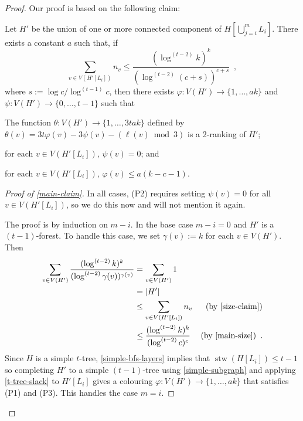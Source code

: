 \documentclass[kpfonts]{patmorin}
\DeclareMathOperator{\stw}{stw}
\theoremstyle{named}
\begin{document}
\begin{proof}
Our proof is based on the following claim:

    \begin{clm}\label{main-claim}
        Let $H'$ be the union of one or more connected component of $H[\bigcup_{j=i}^m L_i]$. There exists a constant $a$ such that, if
        \begin{equation}
            \sum_{v\in V(H'[L_i])} n_v\le \frac{(\log^{(t-2)} k)^{k}}{(\log^{(t-2)} (c+s))^{c+s}} \enspace , \label{main-size}
        \end{equation}
        where $s:=\log c/\log^{(t-1)} c$,
        then there exists $\varphi:V(H')\to\{1,\ldots,ak\}$ and $\psi:V(H')\to\{0,\ldots,t-1\}$ such that
        \begin{compactenum}[(P1)]
            \item The function $\theta:V(H')\to\{1,\ldots,3tak\}$ defined by $\theta(v)=3t\varphi(v) - 3\psi(v) -(\ell(v)\bmod 3)$ is a 2-ranking of $H'$;
            \item for each $v\in V(H'[L_i])$, $\psi(v)=0$; and
            \item for each $v\in V(H'[L_i])$, $\varphi(v)\le a(k-c-1)$.
        \end{compactenum}
    \end{clm}

    \begin{proof}[Proof of \cref{main-claim}]
        In all cases, (P2) requires setting $\psi(v)=0$ for all $v\in V(H'[L_i])$, so we do this now and will not mention it again.

        The proof is by induction on $m-i$. In the base case $m-i=0$ and $H'$ is a $(t-1)$-forest.
        To handle this case, we set $\gamma(v):=k$ for each $v\in V(H')$.  Then
        \begin{align*}
            \sum_{v\in V(H')} \frac{(\log^{(t-2)} k)^k}{(\log^{(t-2)} \gamma(v))^{\gamma(v)}}
            & = \sum_{v\in V(H')} 1 \\
            & = |H'| \\
            & \le \sum_{v\in V(H'[L_i])} n_v  & \text{(by \cref{size-claim})}\\
            & \le \frac{(\log^{(t-2)} k)^{k}}{(\log^{(t-2)} c)^c} & \text{(by \cref{main-size})} \enspace .
        \end{align*}
        Since $H$ is a simple $t$-tree, \cref{simple-bfs-layers} implies that $\stw(H[L_i])\le t-1$ so completing $H'$ to a simple $(t-1)$-tree using \cref{simple-subgraph} and applying \cref{t-tree-slack} to $H'[L_i]$ gives a colouring $\varphi: V(H')\to\{1,\ldots,ak\}$ that satisfies (P1) and (P3).  This handles the case $m=i$.


\end{proof}
\end{proof}
\end{document}

